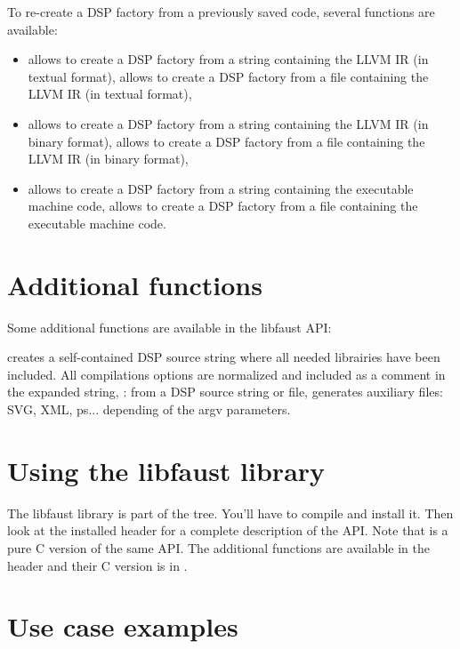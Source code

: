 To re-create a DSP factory from a previously saved code, several functions are available:

\begin{itemize}
\item {} allows to create a DSP factory from a string containing the LLVM IR (in textual format),  allows to create a DSP factory from a file containing the LLVM IR (in textual format),
\item {} allows to create a DSP factory from a string containing the LLVM IR (in binary format),  allows to create a DSP factory from a file containing the LLVM IR (in binary format),
\item {} allows to create a DSP factory from a string containing the executable machine code,  allows to create a DSP factory from a file containing the executable machine code.
\end{itemize}

\section{Additional functions}

Some additional functions are available in the libfaust API:

 creates a self-contained DSP source string where all needed librairies have been included. All compilations options are normalized and included as a comment in the expanded string,
: from a DSP source string or file, generates auxiliary files: SVG, XML, ps... depending of the argv parameters.

\section{Using the libfaust library}

The libfaust library is part of the \faust tree. You'll have to compile and install it. Then look at the installed  header for a complete description of the API. Note that  is a pure C version of the same API. The additional functions are available in the  header and their C version is in .

\section{Use case examples}

